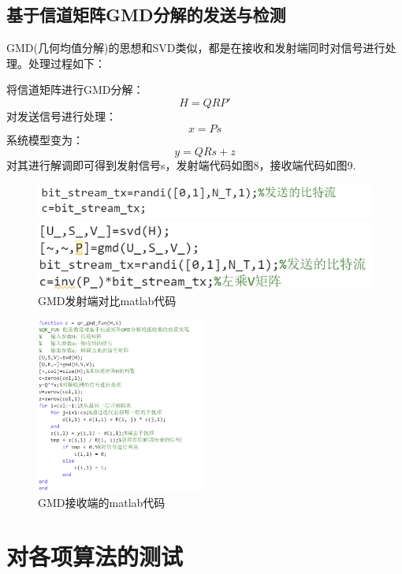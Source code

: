 \documentclass[a4paper,12pt]{article}
\begin{document}
	\subsection{基于信道矩阵GMD分解的发送与检测}
	GMD(几何均值分解)的思想和SVD类似，都是在接收和发射端同时对信号进行处理。处理过程如下：\par
	将信道矩阵进行GMD分解：
	$$H=QRP'$$
	对发送信号进行处理：
	$$x=Ps$$
	系统模型变为：
	$$y=QRs+z$$
	对其进行解调即可得到发射信号s，发射端代码如图8，接收端代码如图9.
	\begin{figure}[h]
		\centering
		\begin{minipage}{0.45\textwidth}
			\centering
			\includegraphics[width=\textwidth]{7.png}
		\end{minipage}
		\qquad
		\begin{minipage}{0.45\textwidth}
			\centering
			\includegraphics[width=\textwidth]{10.png}
		\end{minipage}
		\caption{GMD发射端对比matlab代码}
	\end{figure}
	\begin{figure}[h]
		\centering
		\includegraphics[width=0.5\textwidth]{11.png}
		\caption{GMD接收端的matlab代码}
	\end{figure}
	\section{对各项算法的测试}
\end{document}
